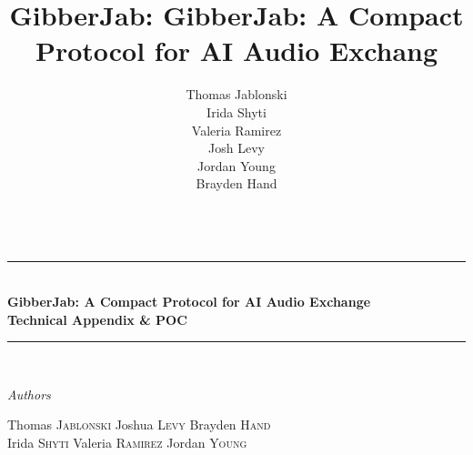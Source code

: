 \documentclass[12pt,openany]{article}
\author{ \begin{tabular}{c}
    Thomas Jablonski \\[0.1cm]
    Irida Shyti \\[0.1cm]
    Valeria Ramirez \\[0.1cm]
    Josh Levy \\[0.1cm]
    Jordan Young \\[0.1cm]
    Brayden Hand \\[0.1cm]
    \end{tabular}\\[1.5cm]}
\theoremstyle{definition}
\theoremstyle{definition}
\theoremstyle{definition}
\newcommand{\HRule}{\rule{\linewidth}{0.5mm}} %
\begin{document}
\title{GibberJab: GibberJab: A Compact Protocol for AI Audio Exchang \\
\large }

\begin{center}
\HRule \\[0.4cm]
{ \LARGE \bfseries GibberJab: A Compact Protocol for AI Audio Exchange\\
\vspace{5mm}
\large  Technical Appendix \& POC}\\[0.2cm] %
\HRule \\[1cm]
\begin{flushleft} \large
\emph{Authors}\\
\end{flushleft}
\begin{boldenv}
\begin{center}
\large
Thomas \textsc{Jablonski} \qquad
Joshua \textsc{Levy} \qquad
Brayden \textsc{Hand} \qquad\\
\vspace{6mm}
\small
Irida \textsc{Shyti} \qquad
Valeria \textsc{Ramirez} \qquad
Jordan \textsc{Young} \qquad
\end{center}
\end{boldenv}
\vspace{6mm}
\end{center}
\end{document}
